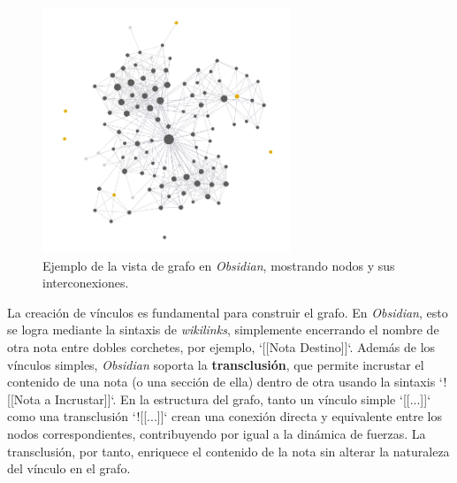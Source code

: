 \begin{figure}[h]
    \centering
    \includegraphics[width=0.66\textwidth]{figures/obsidian_kg_example.png}
    \caption{Ejemplo de la vista de grafo en \textit{Obsidian}, mostrando nodos y sus interconexiones.}
    \label{fig:obsidian_graph}
\end{figure}

La creación de vínculos es fundamental para construir el grafo. En \textit{Obsidian}, esto se logra mediante la sintaxis de \textit{wikilinks}, simplemente encerrando el nombre de otra nota entre dobles corchetes, por ejemplo, `[[Nota Destino]]`. Además de los vínculos simples, \textit{Obsidian} soporta la \textbf{transclusión}, que permite incrustar el contenido de una nota (o una sección de ella) dentro de otra usando la sintaxis `![[Nota a Incrustar]]`. En la estructura del grafo, tanto un vínculo simple `[[...]]` como una transclusión `![[...]]` crean una conexión directa y equivalente entre los nodos correspondientes, contribuyendo por igual a la dinámica de fuerzas. La transclusión, por tanto, enriquece el contenido de la nota sin alterar la naturaleza del vínculo en el grafo.

